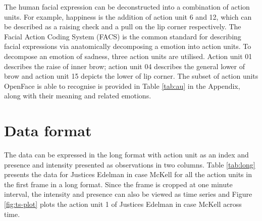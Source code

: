 \documentclass{monashthesis}
\begin{document}
The human facial expression can be deconstructed into a combination of action units. For example, happiness is the addition of action unit 6 and 12, which can be described as a raising check and a pull on the lip corner respectively. The Facial Action Coding System (FACS) is the common standard for describing facial expressions via anatomically decomposing a emotion into action units. To decompose an emotion of sadness, three action units are utilised. Action unit 01 describes the raise of inner brow; action unit 04 describes the general lower of brow and action unit 15 depicts the lower of lip corner. The subset of action units OpenFace is able to recognise is provided in Table \ref{tab:au} in the Appendix, along with their meaning and related emotions.

\hypertarget{data-format}{%
\section{Data format}\label{data-format}}

The data can be expressed in the long format with action unit as an index and presence and intensity presented as observations in two columns. Table \ref{tab:long} presents the data for Justices Edelman in case McKell for all the action units in the first frame in a long format. Since the frame is cropped at one minute interval, the intensity and presence can also be viewed as time series and Figure \ref{fig:ts-plot} plots the action unit 1 of Justices Edelman in case McKell across time.
\end{document}
